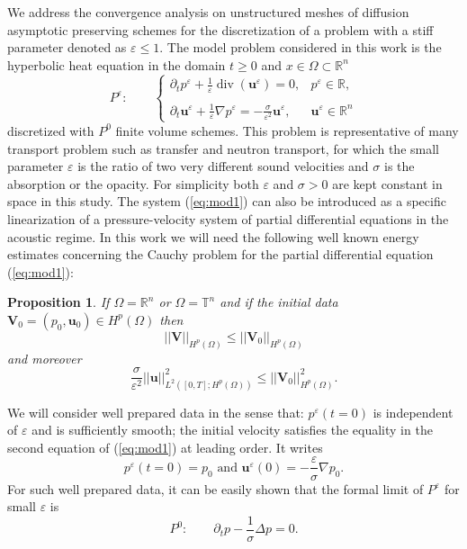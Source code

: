 \documentclass[a4paper,french,english,10pt]{article}
\newcommand\uu{\mathbf{u}}
\newcommand\eps{\varepsilon}
\newcommand{\ds}{\displaystyle}
\newcommand\V{\mathbf{V}}
\newtheorem{proposition}[theorem]{Proposition}
\begin{document}
We address the convergence analysis  on unstructured meshes
of diffusion
asymptotic preserving schemes for the discretization
of a problem with a stiff parameter denoted as $\eps\leq 1$.
The model problem considered in this work
is  the hyperbolic heat equation in the domain 
$t\geq 0$ and  $x\in \Omega\subset \mathbb R^n$
\begin{equation} \label{eq:mod1}
P^\varepsilon: \qquad 
\left\{\begin{array}{ll}
\ds\partial_t p^{\eps}+\frac{1}{\eps}\operatorname{div}(\uu^{\eps})=0,
& p^{\eps}\in \mathbb R, \\
\\
\ds\partial_t \uu^{\eps}+\frac{1}{\eps}\nabla
p^{\eps}=-\frac{\sigma}{\eps^2}\uu^{\eps},
& \uu^{\eps}  \in \mathbb R^n
 \end{array}\right.
\end{equation}
discretized with $P^0$ finite volume schemes.
This problem is representative
of many  transport problem such
as transfer and neutron transport,  for which the small parameter
$\eps$ is the ratio of two very different sound velocities and
$\sigma$ is the absorption or the opacity.
For simplicity both $\eps$ and  $\sigma>0$ are kept constant in space in this study.
The system (\ref{eq:mod1}) can also be introduced as a specific linearization
of a pressure-velocity system of partial differential equations
in the acoustic regime. In this work we will need the following well known energy estimates concerning 
the Cauchy problem for the partial differential equation (\ref{eq:mod1}): 
\begin{proposition}\label{bee}
If $\Omega= \mathbb R^n$ or $\Omega= \mathbb T^n$ and if the initial data $\V_0=(p_0,\uu_0) \in H^p( \Omega)$ then
\begin{equation}\label{bee1}
\vert\vert \V \vert \vert_{H^p( \Omega)}\leq \vert\vert \V_0 \vert \vert_{H^p( \Omega)}
\end{equation}
 and moreover 
\begin{equation}\label{bee2}
\frac{\sigma}{\eps^2}\vert\vert \uu \vert \vert^2_{L^2([0,T];H^p( \Omega))}\leq \vert\vert \V_0 \vert \vert^2_{H^p( \Omega)}.
\end{equation}
\end{proposition}
We will consider well prepared data in the sense that:
 $p^\eps(t=0)$
is independent of $\eps$ and is sufficiently smooth;
the initial velocity satisfies the equality in the second equation
of (\ref{eq:mod1}) at leading order. It writes 
\begin{equation} \label{eq:iniwp}
p^\eps(t=0)=p_0 \mbox{ and } 
\mathbf u^\eps(0)=-\frac\eps\sigma \nabla p_0.
\end{equation}
For such well prepared data, it can be easily shown that
the formal limit of $P^\varepsilon$ for small $\eps$ is
\begin{equation} \label{eq:mod2}
P^0: \qquad
\partial_t p - \frac1\sigma \Delta p=0. 
\end{equation}
\end{document}
